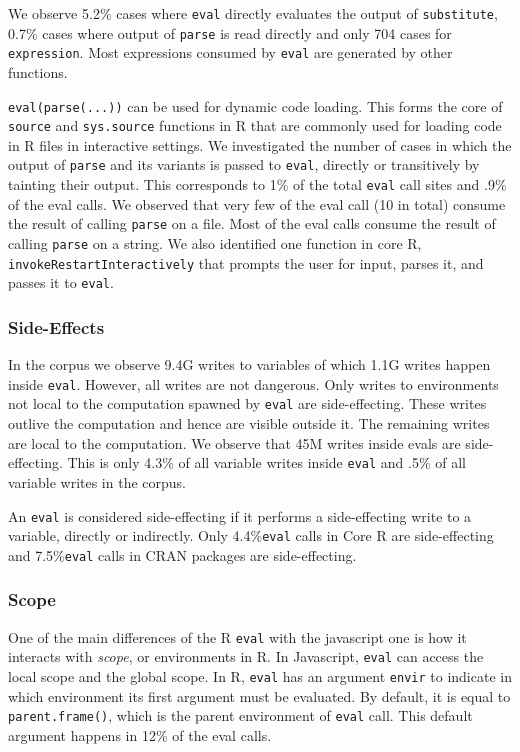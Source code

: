 \documentclass[a4paper,USenglish,cleveref, autoref, thm-restate]{lipics-v2019}
\newcommand{\AllWritesRnd}{9.4G\xspace}
\newcommand{\EvalWritesRnd}{1.1G\xspace}
\newcommand{\EvalSideEffectingWritesRnd}{45M\xspace}
\newcommand{\EvalSideEffectingWritesEvalPerc}{4.3\%\xspace}
\newcommand{\EvalSideEffectingWritesAllPerc}{.5\%\xspace}
\newcommand{\SideEffectingCoreCallPerc}{4.4\%\xspace}
\newcommand{\SideEffectingPackageCallPerc}{7.5\%\xspace}
\newcommand{\DefaultEnvirExprPercent}{12\%\xspace}
\newcommand{\PercentParsedEvals}{.9\%\xspace}
\newcommand{\PercentParsedCallSites}{1\%\xspace}
\newcommand{\NbParseFilesRnd}{10\xspace}
\newcommand{\eval}{\texttt{eval}\xspace}
\renewcommand{\c}[1]{\lstinline{#1}\xspace}
\begin{document}
We observe 5.2\% cases where \eval directly evaluates the output of
\c{substitute}, 0.7\% cases where output of \c{parse} is read directly and
only 704 cases for \c{expression}. Most expressions consumed by \eval are
generated by other functions.

\c{eval(parse(...))} can be used for dynamic code loading. This forms the
core of \c{source} and \c{sys.source} functions in R that are commonly used
for loading code in R files in interactive settings. We investigated the
number of cases in which the output of \c{parse} and its variants is passed
to \eval, directly or transitively by tainting their output. This
corresponds to \PercentParsedCallSites of the total \eval call sites and
\PercentParsedEvals of the eval calls. We observed that very few of the eval
call (\NbParseFilesRnd in total) consume the result of calling \c{parse} on
a file. Most of the eval calls consume the result of calling \c{parse} on a
string.  We also identified one function in core R,
\c{invokeRestartInteractively} that prompts the user for input, parses it,
and passes it to \eval.

\subsubsection{Side-Effects}

In the corpus we observe \AllWritesRnd writes to variables of which
\EvalWritesRnd writes happen inside \eval. However, all writes are not
dangerous. Only writes to environments not local to the computation spawned
by \eval are side-effecting. These writes outlive the computation and hence
are visible outside it. The remaining writes are local to the
computation. We observe that \EvalSideEffectingWritesRnd writes inside evals
are side-effecting. This is only \EvalSideEffectingWritesEvalPerc of all
variable writes inside \eval and \EvalSideEffectingWritesAllPerc of all
variable writes in the corpus.

An \eval is considered side-effecting if it performs a side-effecting write to a
variable, directly or indirectly. Only \SideEffectingCoreCallPerc \eval calls in
Core R are side-effecting and \SideEffectingPackageCallPerc \eval calls in CRAN
packages are side-effecting.

\subsubsection{Scope}

One of the main differences of the R \eval with the javascript one is how it
interacts with \emph{scope}, or environments in R. In Javascript, \eval can
access the local scope and the global scope. In R, \eval has an argument
\c{envir} to indicate in which environment its first argument must be evaluated.
By default, it is equal to \c{parent.frame()}, 
which is the parent environment of \eval call. This default argument
happens in \DefaultEnvirExprPercent of the eval calls.
\end{document}
